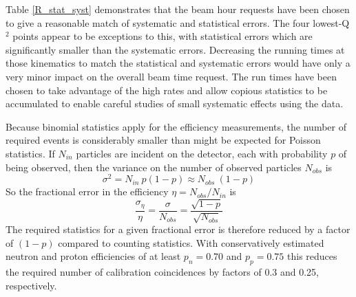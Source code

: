 \documentclass[12pt,letterpaper,oneside]{article}
\begin{document}
Table \ref{R_stat_syst} demonstrates that the beam hour requests have
been chosen to give a reasonable match of systematic and statistical
errors.  The four lowest-Q$^2$ points appear to be exceptions to this,
with statistical errors which are significantly smaller than the 
systematic errors.  Decreasing the running times at those kinematics
to match the statistical and systematic errors would have only a very
minor impact on the overall beam time request.  The run times have
been chosen to take advantage of the high rates and allow copious
statistics to be accumulated to enable careful studies of small
systematic effects using the data.


Because binomial statistics apply for the efficiency measurements,
the number of required events is considerably smaller than might be
expected for Poisson statistics.  If $N_{in}$
particles are incident on the detector, each with probability $p$ of
being observed, then the variance on the number of observed particles
$N_{obs}$ is
$$\sigma^2=N_{in}~p(1-p)\approx N_{obs}~(1-p)$$
So the fractional error in the efficiency $\eta=N_{obs}/N_{in}$ is
$$\frac{\sigma_\eta}{\eta}=\frac{\sigma}{N_{obs}}=\frac{\sqrt{1-p}}{\sqrt{N_{obs}}}$$
The required statistics for a given fractional error is therefore
reduced by a factor of $(1-p)$ compared to counting statistics.  With 
conservatively estimated neutron and proton efficiencies of at 
least $p_n=0.70$ 
and $p_p=0.75$ this reduces the required number of calibration
coincidences by factors of 0.3 and 0.25, respectively.
\end{document}
